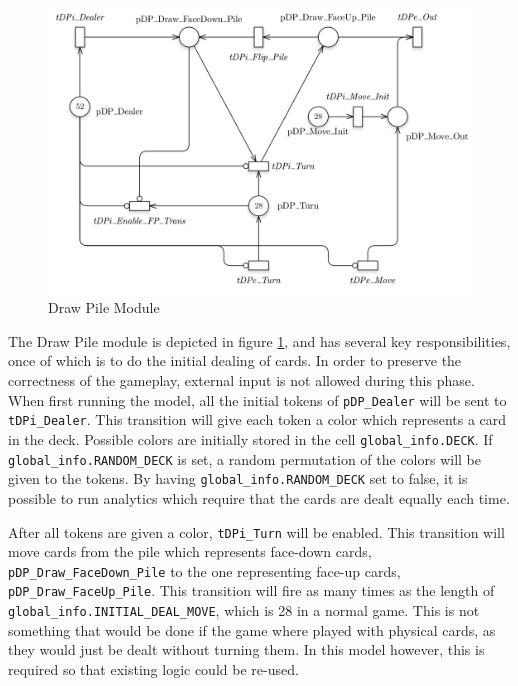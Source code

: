 \documentclass[runningheads,a4paper]{llncs}
\begin{document}
\begin{figure}
	\begin{center}
		\includegraphics[width=\textwidth]{images/drawPile}
		\caption{Draw Pile Module}
		\label{fig:draw_pile}
	\end{center}
\end{figure}
The Draw Pile module is depicted in figure \ref{fig:draw_pile}, and has several key responsibilities, once of which is to do the initial dealing of cards. In order to preserve the correctness of the gameplay, external input is not allowed during this phase. When first running the model, all the initial tokens of \verb!pDP_Dealer! will be sent to \verb!tDPi_Dealer!. This transition will give each token a color which represents a \ac{card} in the deck. Possible colors are initially stored in the cell \verb!global_info.DECK!. If \verb!global_info.RANDOM_DECK! is set, a random permutation of the colors will be given to the tokens. By having \verb!global_info.RANDOM_DECK! set to false, it is possible to run analytics which require that the cards are dealt equally each time.
\newline

After all tokens are given a color, \verb!tDPi_Turn! will be enabled. This transition will move cards from the pile which represents face-down cards, \verb!pDP_Draw_FaceDown_Pile! to the one representing face-up cards, \verb!pDP_Draw_FaceUp_Pile!. This transition will fire as many times as the length of \verb!global_info.INITIAL_DEAL_MOVE!, which is 28 in a normal game. This is not something that would be done if the game where played with physical cards, as they would just be dealt without turning them. In this model however, this is required so that existing logic could be re-used.
\newline
\end{document}
